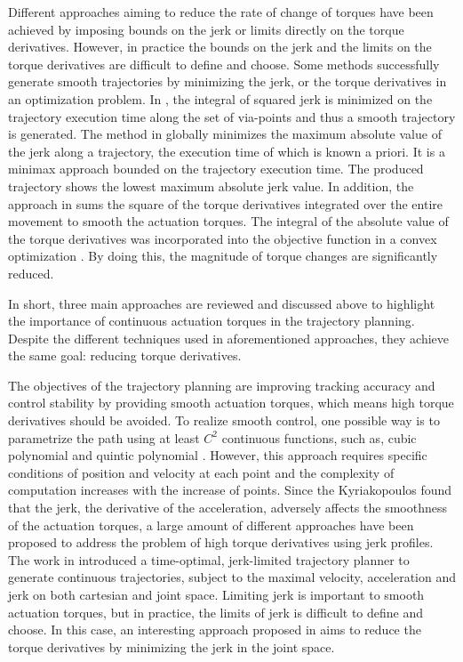 Different approaches aiming to reduce the rate of change of torques have been achieved by imposing bounds on the jerk or limits directly on the torque derivatives. However, in practice the bounds on the jerk and the limits on the torque derivatives are difficult to define and choose. Some methods successfully generate smooth trajectories by minimizing the jerk, or the torque derivatives in an optimization problem. In \cite{simon1993}, the integral of squared jerk is minimized on the trajectory execution time along the set of via-points and thus a smooth trajectory is generated. The method in \cite{piazzi2000} globally minimizes the maximum absolute value of the jerk along a trajectory, the execution time of which is known a priori. It is a minimax approach bounded on the trajectory execution time. The produced trajectory shows the lowest maximum absolute jerk value. In addition, the approach in \cite{uno1989} sums the square of the torque derivatives integrated over the entire movement to smooth the actuation torques. The integral of the absolute value of the torque derivatives was incorporated into the objective function in a convex optimization \cite{verscheure2008}. By doing this, the magnitude of torque changes are significantly reduced. 

In short, three main approaches are reviewed and discussed above to highlight the importance of continuous actuation torques in the trajectory planning. Despite the different techniques used in aforementioned approaches, they achieve the same goal: reducing torque derivatives. 


The objectives of the trajectory planning are improving tracking accuracy and control stability by providing smooth actuation torques, which means high torque derivatives should be avoided. To realize smooth control, one possible way is to parametrize the path using at least $C^2$ continuous functions, such as, cubic polynomial \cite{chand1985,cao1994} and quintic polynomial \cite{andersson1989}. However, this approach requires specific conditions of position and velocity at each point and the complexity of computation increases with the increase of points. Since the Kyriakopoulos \cite{kyriakopoulos1988} found that the jerk, the derivative of the acceleration, adversely affects the smoothness of the actuation torques, a large amount of different approaches have been proposed to address the problem of high torque derivatives using jerk profiles. The work in \cite{macfarlane2003,herrera2006, haschke2008} introduced a time-optimal, jerk-limited trajectory planner to generate continuous trajectories, subject to the maximal velocity, acceleration and jerk on both cartesian and joint space. Limiting jerk is important to smooth actuation torques, but in practice, the limits of jerk is difficult to define and choose. In this case, an interesting approach proposed in \cite{piazzi2000} aims to reduce the torque derivatives by minimizing the jerk in the joint space. 

